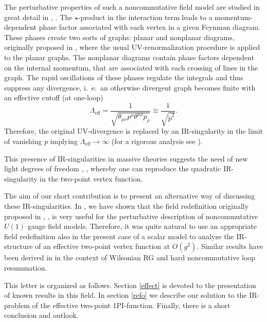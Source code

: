 \documentclass[a4paper,12pt]{article}
\begin{document}
The perturbative properties of such a noncommutative field model are studied in great detail in \cite{Minwalla:1999px}, \cite{VanRaamsdonk:2000rr}. The $\star$-product in the interaction term leads to a momentum-dependent phase factor associated with each vertex in a given Feynman diagram. These phases create two sorts of graphs: planar and nonplanar diagrams, originally proposed in \cite{Filk:dm}, where the usual UV-renormalization procedure is applied to the planar graphs. The nonplanar diagrams contain phase factors dependent on the internal momentum, that are associated with each crossing of lines in the graph. The rapid oscillations of these phases regulate the integrals and thus suppress any divergence, i.~e.\ an otherwise divergent graph becomes finite with an effective cutoff (at one-loop)
\begin{equation}
  \Lambda_\mathrm{eff} = \frac{1}{\sqrt{\theta_{\mu\nu} p^\nu \theta^{\mu\rho}
    p_\rho}} \equiv \frac{1}{\sqrt{\tilde{p}^2}}.
\end{equation}
Therefore, the original UV-divergence is replaced by an IR-singularity in the limit of vanishing $p$ implying $\Lambda_{\mathrm{eff}} \rightarrow \infty$ (for a rigorous analysis see \cite{Chepelev:2000hm}).

This presence of IR-singularities in massive theories suggests the need of new light degrees of freedom \cite{Minwalla:1999px}, \cite{VanRaamsdonk:2000rr}, whereby one can reproduce the quadratic IR-singularity in the two-point vertex function.

The aim of our short contribution is to present an alternative way of discussing these IR-singularities. In \cite{Bichl:2001cq}, \cite{redef} we have shown that the field redefinition originally proposed in \cite{Bichl:2001nf}, \cite{Bastianelli:1990ey}, \cite{Alfaro:1992cs} is very useful for the perturbative description of noncommutative $U(1)$ gauge field models. Therefore, it was quite natural to use an appropriate field redefinition also in the present case of a scalar model to analyze the IR-structure of an effective two-point vertex function at $O(g^2)$. Similar results have been derived in \cite{Griguolo:2001ez} in the context of Wilsonian RG and hard noncommutative loop resummation.

This letter is organized as follows. Section \ref{effect} is devoted to the presentation of known results in this field. In section \ref{refo} we describe our solution to the IR-problem of the effective two-point 1PI-function. Finally, there is a short conclusion and outlook.
\end{document}
